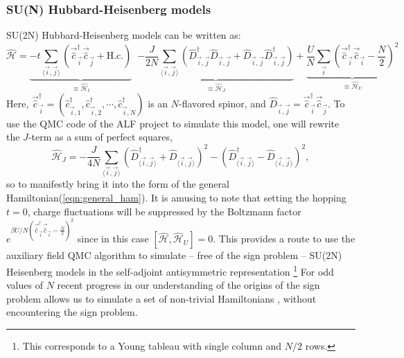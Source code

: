 \subsubsection{SU(N) Hubbard-Heisenberg models}

SU(2N) Hubbard-Heisenberg \cite{Assaad04,Lang13} models can be written as:
\begin{equation}
 \hat{\mathcal{H}}  =  
 \underbrace{ - t \sum_{ \langle \vec{i},\vec{j} \rangle }    \left(  \vec{\hat{c}}^{\dagger}_{\vec{i}}  \vec{\hat{c}}^{\phantom{\dagger}}_{\vec{j}} + \text{H.c.} \right) }_{\equiv \hat{\mathcal{H}}_t} \; \; 
\underbrace{ -\frac{J}{2 N}  \sum_{ \langle \vec{i},\vec{j} \rangle  } \left(
           \hat{D}^{\dagger}_{ \vec{i},\vec{j} }\hat{D}^{\phantom\dagger}_{ \vec{i},\vec{j}}  +
            \hat{D}^{\phantom\dagger}_{ \vec{i},\vec{j} } \hat{D}^{\dagger}_{ \vec{i},\vec{j} }  \right) }_{\equiv\hat{\mathcal{H}}_J}
            + 
 \underbrace{\frac{U}{N}  \sum_{\vec{i}} \left(
             \vec{\hat{c}}^{\dagger}_{\vec{i}}  \vec{\hat{c}}^{\phantom\dagger}_{\vec{i}} -  {\frac{N}{2} } \right)^2}_{\equiv \hat{\mathcal{H}}_U}
\end{equation}
Here,
$ \vec{\hat{c}}^{\dagger}_{\vec{i}} =
(\hat{c}^{\dagger}_{\vec{i},1},  \hat{c}^{\dagger}_{\vec{i},2}, \cdots, \hat{c}^{\dagger}_{\vec{i}, N } ) $  is an
$N$-flavored spinor, and $ \hat{D}_{ \vec{i},\vec{j}} = \vec{\hat{c}}^{\dagger}_{\vec{i}}
\vec{\hat{c}}_{\vec{j}}  $.
To use the QMC code of the ALF project  to simulate this model, one will rewrite  the $J$-term as a sum of perfect squares, 
\begin{equation}
        \hat{\mathcal{H}}_J =  -\frac{J}{4 N}  \sum_{  \langle \vec{i}, \vec{j} \rangle }
        \left(\hat{D}^{\dagger}_{  \langle \vec{i}, \vec{j} \rangle  } +  \hat{D}_{  \langle \vec{i}, \vec{j} \rangle }  \right)^2  -
        \left(\hat{D}^{\dagger}_{   \langle \vec{i}, \vec{j} \rangle } -  \hat{D}_{  \langle \vec{i}, \vec{j} \rangle}  \right)^2,
\end{equation}
so to manifestly bring it into the form of the general Hamiltonian(\ref{eqn:general_ham}). 
It is amusing to note that setting the hopping $t=0$,    charge fluctuations  will be suppressed by the  Boltzmann factor $e^{\beta U /N \left(  \vec{\hat{c}}^{\dagger}_{\vec{i}}  \vec{\hat{c}}^{\phantom\dagger}_{\vec{i}} -  {\frac{N}{2} } \right)^2 } $ 
since in this case  $ \left[   \hat{\mathcal{H}}, \hat{\mathcal{H}}_U \right]  = 0 $.
This provides a route to use the auxiliary field QMC algorithm  to simulate -- free of the sign problem -- SU(2N) Heisenberg models in the self-adjoint antisymmetric representation  \footnote{ This corresponds to a Young tableau with single column and $N/2$ rows.}  
For odd values of $N$ recent progress  in our understanding of the  origins of the sign problem \cite{Wei16}  allows us to simulate  a set of non-trivial Hamiltonians \cite{Li15,Assaad16},  without encountering the sign problem.

